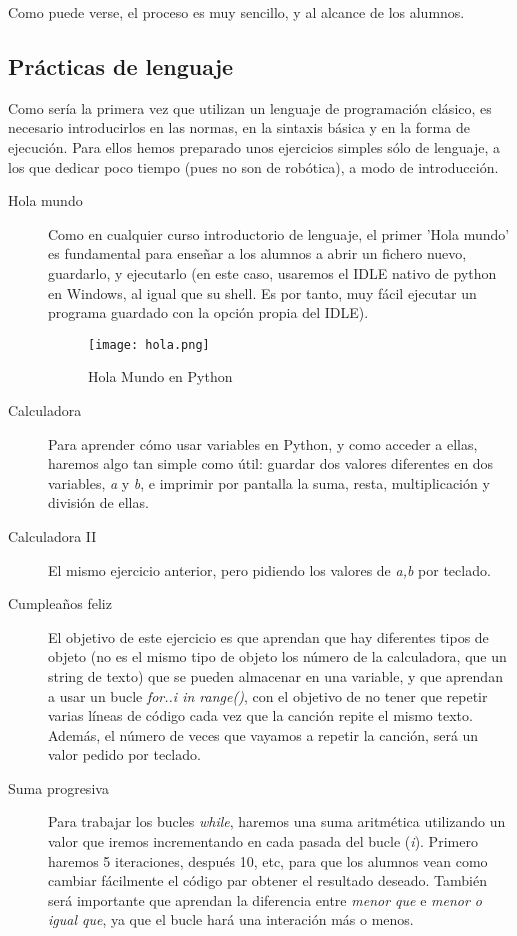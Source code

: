 Como puede verse, el proceso es muy sencillo, y al alcance de los alumnos. 
\subsection{Prácticas de lenguaje}
Como sería la primera vez que utilizan un lenguaje de programación clásico, es necesario introducirlos en las normas, en la sintaxis básica y en la forma de ejecución. Para ellos hemos preparado unos ejercicios simples sólo de lenguaje, a los que dedicar poco tiempo (pues no son de robótica), a modo de introducción.
\begin{description}
\item [Hola mundo] Como en cualquier curso introductorio de lenguaje, el primer 'Hola mundo' es fundamental para enseñar a los alumnos a abrir un fichero nuevo, guardarlo, y ejecutarlo (en este caso, usaremos el IDLE nativo de python en Windows, al igual que su shell. Es por tanto, muy fácil ejecutar un programa guardado con la opción propia del IDLE).
	\begin{figure}[H]
		\texttt{[image: hola.png]}
		\centering
		\label{img:holamundo}
		\caption{Hola Mundo en Python}
	\end{figure}
\item [Calculadora] Para aprender cómo usar variables en Python, y como acceder a ellas, haremos algo tan simple como útil: guardar dos valores diferentes en dos variables, \textit{a} y \textit{b}, e imprimir por pantalla la suma, resta, multiplicación y división de ellas. 
\item[Calculadora II] El mismo ejercicio anterior, pero pidiendo los valores de \textit{a,b} por teclado. 
\item[Cumpleaños feliz] El objetivo de este ejercicio es que aprendan que hay diferentes tipos de objeto (no es el mismo tipo de objeto los número de la calculadora, que un string de texto) que se pueden almacenar en una variable, y que aprendan a usar un bucle \textit{for..i in range()}, con el objetivo de no tener que repetir varias líneas de código cada vez que la canción repite el mismo texto. Además, el número de veces que vayamos a repetir la canción, será un valor pedido por teclado.
\item [Suma progresiva] Para trabajar los bucles \textit{while}, haremos una suma aritmética utilizando un valor que iremos incrementando en cada pasada del bucle (\textit{i}). Primero haremos 5 iteraciones, después 10, etc, para que los alumnos vean como cambiar fácilmente el código par obtener el resultado deseado. También será importante que aprendan la diferencia entre \textit{menor que} e \textit{menor o igual que}, ya que el bucle hará una interación más o menos.

\end{description}
